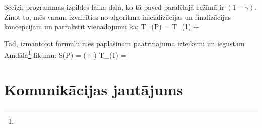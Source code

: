 Secīgi, programmas izpildes laika daļa, ko tā paved paralēlajā režīmā ir
$(1 - \gamma)$. Zinot to, mēs varam izvairīties no algoritma inicializācijas un
finalizācijas koncepcijām un pārrakstīt vienādojumu 
kā:
	{T_(P) = \gamma \cdot T_(1) +
	}

Tad, izmantojot formulu  mēs paplašinam paātrinājuma
izteiksmi  un iegustam Amdāla\footnote{} likumu:
	{S(P) = 
	             {(\gamma + ) \cdot T_(1)}
	      = }

\section{Komunikācijas jautājums}
